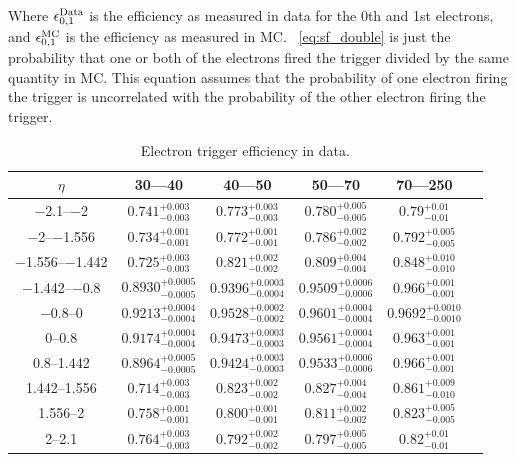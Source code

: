 Where $\epsilon^{\text{Data}}_{0,1}$ is the efficiency as measured in data for the 0th and
1st electrons, and $\epsilon^{\text{MC}}_{0,1}$ is the efficiency as measured in MC.
\EQ~\ref{eq:sf_double} is just the probability that one or both of the
electrons fired the trigger divided by the same quantity in MC. This equation
assumes that the probability of one electron firing the trigger is uncorrelated
with the probability of the other electron firing the trigger.

\begin{table}[h]
\centering
{}
\begin{center}
    \begin{tabular}{@{}c c c c c c@{}}
    \toprule
	$\eta$ & 30---40 \GeV & 40---50 \GeV & 50---70 \GeV & 70---250 \GeV  \\
    \midrule
	\numrange{-2.1}{-2} & $0.741^{+0.003}_{-0.003}$ & $0.773^{+0.003}_{-0.003}$ & $0.780^{+0.005}_{-0.005}$ & $0.79^{+0.01}_{-0.01}$  \\
	\numrange{-2}{-1.556} & $0.734^{+0.001}_{-0.001}$ & $0.772^{+0.001}_{-0.001}$ & $0.786^{+0.002}_{-0.002}$ & $0.792^{+0.005}_{-0.005}$  \\
	\numrange{-1.556}{-1.442} & $0.725^{+0.003}_{-0.003}$ & $0.821^{+0.002}_{-0.002}$ & $0.809^{+0.004}_{-0.004}$ & $0.848^{+0.010}_{-0.010}$  \\
	\numrange{-1.442}{-0.8} & $0.8930^{+0.0005}_{-0.0005}$ & $0.9396^{+0.0003}_{-0.0004}$ & $0.9509^{+0.0006}_{-0.0006}$ & $0.966^{+0.001}_{-0.001}$  \\
	\numrange{-0.8}{0} & $0.9213^{+0.0004}_{-0.0004}$ & $0.9528^{+0.0002}_{-0.0002}$ & $0.9601^{+0.0004}_{-0.0004}$ & $0.9692^{+0.0010}_{-0.0010}$  \\
	\numrange{0}{0.8} & $0.9174^{+0.0004}_{-0.0004}$ & $0.9473^{+0.0003}_{-0.0003}$ & $0.9561^{+0.0004}_{-0.0004}$ & $0.963^{+0.001}_{-0.001}$  \\
	\numrange{0.8}{1.442} & $0.8964^{+0.0005}_{-0.0005}$ & $0.9424^{+0.0003}_{-0.0003}$ & $0.9533^{+0.0006}_{-0.0006}$ & $0.966^{+0.001}_{-0.001}$  \\
	\numrange{1.442}{1.556} & $0.714^{+0.003}_{-0.003}$ & $0.823^{+0.002}_{-0.002}$ & $0.827^{+0.004}_{-0.004}$ & $0.861^{+0.009}_{-0.010}$  \\
	\numrange{1.556}{2} & $0.758^{+0.001}_{-0.001}$ & $0.800^{+0.001}_{-0.001}$ & $0.811^{+0.002}_{-0.002}$ & $0.823^{+0.005}_{-0.005}$  \\
	\numrange{2}{2.1} & $0.764^{+0.003}_{-0.003}$ & $0.792^{+0.002}_{-0.002}$ & $0.797^{+0.005}_{-0.005}$ & $0.82^{+0.01}_{-0.01}$  \\
    \bottomrule
    \end{tabular}
\end{center}
\caption{
    Electron trigger efficiency in data.
}
\label{trigger_eff_data}
\end{table}

